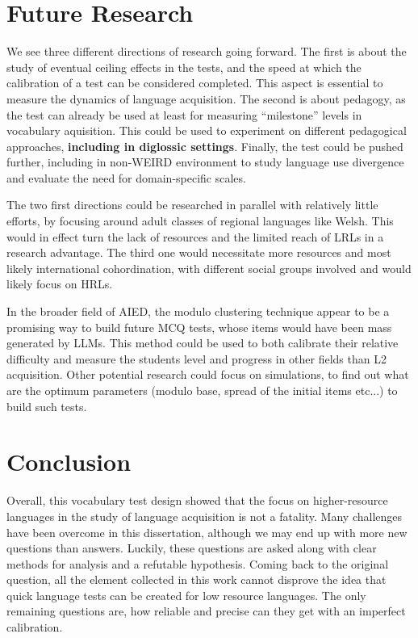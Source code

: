 \section{Future Research}
We see three different directions of research going forward. The first is about the study of eventual ceiling effects in the tests, and the speed at which the calibration of a test can be considered completed. This aspect is essential to measure the dynamics of language acquisition. The second is about pedagogy, as the test can already be used at least for measuring ``milestone'' levels in vocabulary aquisition. This could be used to experiment on different pedagogical approaches, \textbf{including in diglossic settings}. Finally, the test could be pushed further, including in non-WEIRD environment to study language use divergence and evaluate the need for domain-specific scales.

The two first directions could be researched in parallel with relatively little efforts, by focusing around adult classes of regional languages like Welsh. This would in effect turn the lack of resources and the limited reach of LRLs in a research advantage. The third one would necessitate more resources and most likely international cohordination, with different social groups involved and would likely focus on HRLs.

In the broader field of AIED, the modulo clustering technique appear to be a promising way to build future MCQ tests, whose items would have been mass generated by LLMs. This method could be used to both calibrate their relative difficulty and measure the students level and progress in other fields than L2 acquisition. Other potential research could focus on simulations, to find out what are the optimum parameters (modulo base, spread of the initial items etc...) to build such tests.

\section{Conclusion}
Overall, this vocabulary test design showed that the focus on higher-resource languages in the study of language acquisition is not a fatality. Many challenges have been overcome in this dissertation, although we may end up with more new questions than answers. Luckily, these questions are asked along with clear methods for analysis and a refutable hypothesis. Coming back to the original question, all the element collected in this work cannot disprove the idea that quick language tests can be created for low resource languages. The only remaining questions are, how reliable and precise can they get with an imperfect calibration.

